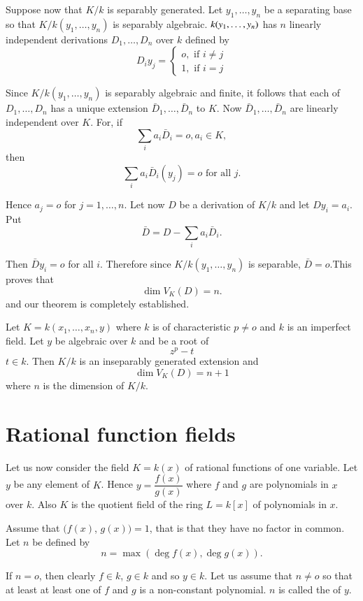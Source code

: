 Suppose now that $K/k$ is separably generated. Let $y_1, \ldots,y_n$
be a separating base so that $K/k(y_1, \ldots, y_n)$ is separably
algebraic. $k(y_1,\break \ldots, y_n)$ has $n$ linearly independent
derivations $D_1,\ldots,D_n$ over $k$ defined by 
\begin{equation*}
D_iy_j=
\begin{cases}
o, \text{ if } i \neq j\\
1, \text{ if } i = j
\end{cases}
\end{equation*}\pageoriginale 

Since $K/k(y_1, \ldots, y_n)$ is separably algebraic and finite, it
follows that each of $D_1,\ldots,D_n$ has a unique extension
$\bar{D}_1,\ldots,\bar{D}_n$ to $K$. Now
$\bar{D}_1,\ldots,\bar{D}_n$ are linearly independent over
$K$. For, if  
$$
\sum_i a_i \bar{D}_i = o , a_i \in K,
$$
then 
$$
\sum_i a_i \bar{D}_i(y_j) = o \text{ for all } j.
$$

Hence $a_j =o$ for $j=1, \ldots,n$. Let now $D$ be a derivation of
$K/k$ and let $D y_i = a_i$. Put  
$$
\bar{D} = D-\sum_i a_i \bar{D}_i.
$$

Then $\bar{D} y_i = o$ for all $i$. Therefore since $K/k(y_1, \ldots,
y_n)$ is separable, $\bar{D}=o$.This proves that  
$$
\dim V_K(D) =n.
$$
and our theorem is completely established. 

Let $K=k(x_1, \ldots, x_n,y)$ where $k$ is of characteristic $p \neq
o$ and $k$ is an imperfect field. Let $y$ be algebraic over $k$ and be
a root of  
$$
z^p-t
$$
$t \in k$. Then $K/k$ is an inseparably generated extension and  
$$
\dim V_K(D) = n+1
$$
where $n$ is the dimension of $K/k$.

\section{Rational function fields}\label{c3:s3}\pageoriginale %

Let us now consider the field $K=k(x)$ of rational functions of one
variable. Let $y$ be any element of $K$. Hence $y=\dfrac{f(x)}{g(x)}$
where $f$ and $g$ are polynomials in $x$ over $k$. Also $K$ is the
quotient field of the ring $L=k[x]$ of polynomials in $x$. 

Assume that $(f(x)$, $g(x))=1$, that is that they have no factor in
common. Let $n$ be defined by  
$$
n=\max(\deg f(x), \deg g(x)).
$$

If $n=o$, then clearly $f \in k$, $g \in k$ and so $y \in k$. Let us
assume that $n \neq o$ so that at least at least one of $f$ and $g$ is
a non-constant polynomial. $n$ is called the  of $y$. 


